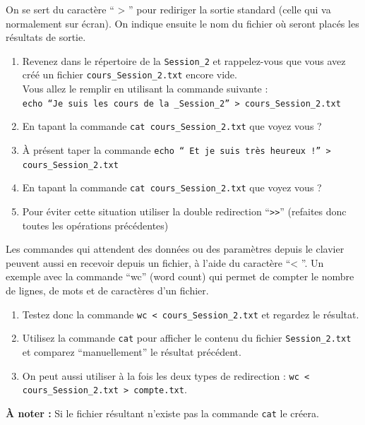 \documentclass{article}
\begin{document}
\begin{exercice}[En sortie]

On se sert du caractère `` > '' pour rediriger la sortie standard (celle qui va normalement sur écran). On indique ensuite le nom du fichier où seront placés les résultats de sortie.

\begin{enumerate}

\item
Revenez dans le répertoire de la \texttt{Session\_2} et rappelez-vous que vous avez créé un fichier \texttt{cours\_{Session\_2}.txt} encore vide. \\
Vous allez le remplir en utilisant la commande suivante : \\
\texttt{echo ``Je suis les cours de la \_Session\_2'' > cours\_Session\_2.txt}
\item
En tapant la commande \texttt{cat cours\_Session\_2.txt} que voyez vous ?
\item
À présent taper la commande \texttt{echo `` Et je suis très heureux !'' > cours\_Session\_2.txt}
\item
En tapant la commande \texttt{cat cours\_Session\_2.txt} que voyez vous ?
\item
Pour éviter cette situation utiliser la double redirection ``\verb+>>+'' (refaites donc toutes les opérations précédentes)

\end{enumerate}

\end{exercice}

\begin{exercice}[En entrée]

Les commandes qui attendent des données ou des paramètres depuis le clavier peuvent aussi en recevoir depuis un fichier, à l'aide du caractère ``< ''. 
Un exemple avec la commande ``wc'' (word count) qui permet de compter le nombre de lignes, de mots et de caractères d'un fichier.

\begin{enumerate}
\item
Testez donc la commande \texttt{wc < cours\_{Session\_2}.txt} et regardez le résultat.
\item
Utilisez la commande \texttt{cat} pour afficher le contenu du fichier \texttt{Session\_2.txt} et comparez ``manuellement'' le résultat précédent.
\item
On peut aussi utiliser à la fois les deux types de redirection : \texttt{wc < cours\_{Session\_2}.txt > compte.txt}.
\end{enumerate}

\textbf{À noter : } Si le fichier résultant n'existe pas la commande \texttt{cat} le créera.

\end{exercice}
\end{document}
